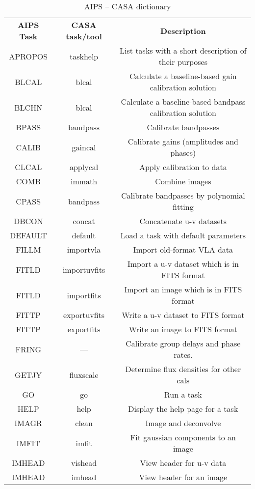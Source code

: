\begin{table}[ht]
\footnotesize
\caption[AIPS -- CASA dictionary]
        {\label{table:aips}AIPS -- CASA dictionary}
\begin{center}
\begin{tabular}{|c|c|c|} \hline
{\bf AIPS Task} &  {\bf CASA task/tool}     &  {\bf Description}   \\
APROPOS  & taskhelp 	 & List tasks with a short description of their purposes\\
BLCAL 	 & blcal   	 & Calculate a baseline-based gain calibration solution\\
BLCHN 	 & blcal   	 & Calculate a baseline-based bandpass calibration solution\\
BPASS 	 & bandpass 	 & Calibrate bandpasses\\
CALIB 	 & gaincal 	 & Calibrate gains (amplitudes and phases)\\
CLCAL 	 & applycal 	 & Apply calibration to data\\
COMB 	 & immath  	 & Combine images\\
CPASS 	 & bandpass   	 & Calibrate bandpasses by polynomial fitting\\
DBCON 	 & concat 	         & Concatenate u-v datasets\\
DEFAULT	 & default 	 & Load a task with default parameters\\
FILLM 	 & importvla 	 & Import old-format VLA data\\
FITLD 	 & importuvfits 	 & Import a u-v dataset which is in FITS format\\
FITLD 	 & importfits 	 & Import an image which is in FITS format\\
FITTP 	 & exportuvfits 	 & Write a u-v dataset to FITS format\\
FITTP 	 & exportfits 	 & Write an image to FITS format\\
FRING 	 & ---     	 & Calibrate group delays and phase rates.\\
GETJY 	 & fluxscale 	 & Determine flux densities for other cals\\
GO 	 & go      	 & Run a task\\
HELP 	 & help 	         & Display the help page for a task\\
IMAGR 	 & clean 	         & Image and deconvolve\\
IMFIT 	 & imfit    	 & Fit gaussian components to an image\\
IMHEAD 	 & vishead 	 & View header for u-v data\\
IMHEAD 	 & imhead 	         & View header for an image\\

\end{tabular}
\end{center}
\end{table}
